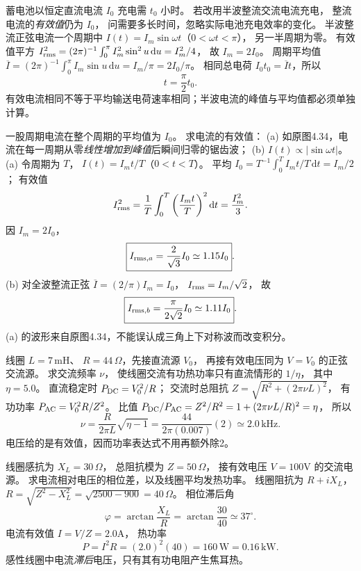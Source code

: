 蓄电池以恒定直流电流 $I_0$ 充电需 $t_0$ 小时。
若改用半波整流交流电流充电，
整流电流的\emph{有效值}仍为 $I_0$，
问需要多长时间，忽略实际电池充电效率的变化。
\exsolution
半波整流正弦电流一个周期中
$I(t)=I_m\sin\omega t$（$0<\omega t<\pi$），
另一半周期为零。
有效值平方
$I_{\rm rms}^2=(2\pi)^{-1}\int_0^\pi I_m^2\sin^2u\,\mathrm du=I_m^2/4$，
故 $I_m=2I_0$。
周期平均值
$\overline I=(2\pi)^{-1}\int_0^\pi I_m\sin u\,\mathrm du=I_m/\pi=2I_0/\pi$。
相同总电荷
$I_0t_0=\overline It$，所以
\[
\boxed{t=\frac\pi2t_0}.
\]
\excheck 有效电流相同不等于平均输送电荷速率相同；半波电流的峰值与平均值都必须单独计算。

一股周期电流在整个周期的平均值为 $I_0$。
求电流的有效值：
(a) 如原图4.34，电流在每一周期从零\emph{线性增加到峰值}后瞬间归零的锯齿波；
(b) $I(t)\propto|\sin\omega t|$。
\exsolution
(a) 令周期为 $T$，
$I(t)=I_m t/T$（$0<t<T$）。
平均
$I_0=T^{-1}\int_0^T I_m t/T\,\mathrm dt=I_m/2$；
有效值
\[
I_{\rm rms}^2=\frac1T\int_0^T
\left(\frac{I_mt}{T}\right)^2\mathrm dt
=\frac{I_m^2}{3}.
\]
因 $I_m=2I_0$，
\[
\boxed{I_{{\rm rms},a}=\frac2{\sqrt3}I_0\simeq1.15I_0}.
\]
(b) 对全波整流正弦
$\overline I=(2/\pi)I_m=I_0$，
$I_{\rm rms}=I_m/\sqrt2$，
故
\[
\boxed{I_{{\rm rms},b}=\frac{\pi}{2\sqrt2}I_0
\simeq1.11I_0}.
\]
\excheck (a) 的波形来自原图4.34，不能误认成三角上下对称波而改变积分。

线圈 $L=7\,\mathrm{mH}$、
$R=44\,\Omega$，先接直流源 $V_0$，
再接有效电压同为 $V=V_0$ 的正弦交流源。
求交流频率 $\nu$，
使线圈交流有功热功率只有直流情形的 $1/\eta$，
其中 $\eta=5.0$。
\exsolution
直流稳定时 $P_{\rm DC}=V_0^2/R$；
交流时总阻抗
$Z=\sqrt{R^2+(2\pi\nu L)^2}$，
有功功率
$P_{\rm AC}=V_0^2R/Z^2$。
比值
$P_{\rm DC}/P_{\rm AC}
=Z^2/R^2=1+(2\pi\nu L/R)^2=\eta$，
所以
\[
\boxed{\nu=\frac{R}{2\pi L}\sqrt{\eta-1}
=\frac{44}{2\pi(0.007)}(2)
\simeq2.0\,\mathrm{kHz}}.
\]
\excheck 电压给的是有效值，因而功率表达式不用再额外除2。

线圈感抗为 $X_L=30\,\Omega$，
总阻抗模为 $Z=50\,\Omega$，
接有效电压 $V=100$V 的交流电源。
求电流相对电压的相位差，以及线圈平均发热功率。
\exsolution
线圈阻抗为 $R+iX_L$，
$R=\sqrt{Z^2-X_L^2}
=\sqrt{2500-900}=40\,\Omega$。
相位滞后角
\[
\boxed{\varphi=\arctan\frac{X_L}{R}
=\arctan\frac{30}{40}
\simeq37^\circ}.
\]
电流有效值 $I=V/Z=2.0$A，
热功率
\[
\boxed{P=I^2R=(2.0)^2(40)
=160\,\mathrm W=0.16\,\mathrm{kW}}.
\]
\excheck 感性线圈中电流\emph{滞后}电压，只有其有功电阻产生焦耳热。
